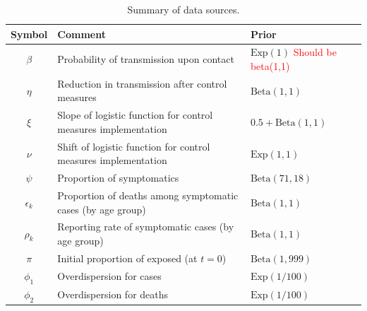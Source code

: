 \documentclass{article}
\begin{document}
\begin{table}[h]
	\centering
	\caption{Summary of data sources.}
	\begin{tabular}{cp{9cm}l}
		\hline
		Symbol & Comment & Prior \\
		\hline 
		$\beta$ & Probability of transmission upon contact & $\text{Exp}(1)$ \textcolor{red}{Should be beta(1,1)}  \\
		$\eta$ & Reduction in transmission after control measures & $\text{Beta}(1,1)$ \\
		$\xi$ & Slope of logistic function for control measures implementation & $ 0.5 +\text{Beta}(1,1)$  \\
		$\nu$ & Shift of logistic function for control measures implementation  & $\text{Exp}(1,1)$  \\
		$\psi$ & Proportion of symptomatics & $\text{Beta}(71,18)$ \\
		$\epsilon_k$ & Proportion of deaths among symptomatic cases (by age group) & $\text{Beta}(1,1)$  \\
		$\rho_k$ & Reporting rate of symptomatic cases (by age group) & $\text{Beta}(1,1)$  \\
		$\pi$ & Initial proportion of exposed (at $t=0$)& $\text{Beta}(1,999)$  \\
		$\phi_1$ & Overdispersion for cases & $\text{Exp}(1/100)$  \\
		$\phi_2$ & Overdispersion for deaths & $\text{Exp}(1/100)$  \\
		
		\hline 
	\end{tabular} 
	
\end{table}
\end{document}
